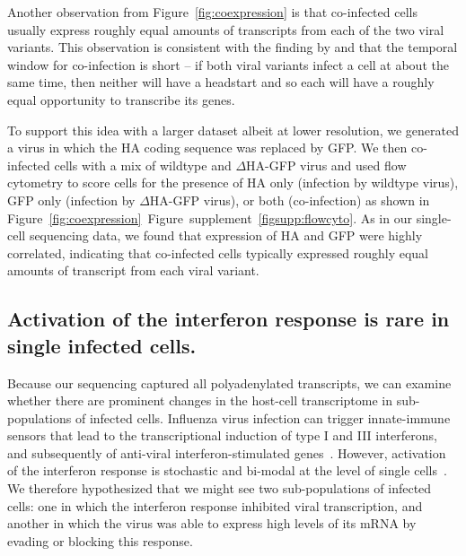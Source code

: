 \documentclass[9pt,lineno]{elife}
\begin{document}
Another observation from Figure~\ref{fig:coexpression} is that co-infected cells usually express roughly equal amounts of transcripts from each of the two viral variants.
This observation is consistent with the finding by \citet{Dou:2017cp} and \citet{Huang:2008gy} that the temporal window for co-infection is short -- if both viral variants infect a cell at about the same time, then neither will have a headstart and so each will have a roughly equal opportunity to transcribe its genes.

To support this idea with a larger dataset albeit at lower resolution, we generated a virus in which the HA coding sequence was replaced by GFP.
We then co-infected cells with a mix of wildtype and $\Delta$HA-GFP virus and used flow cytometry to score cells for the presence of HA only (infection by wildtype virus), GFP only (infection by $\Delta$HA-GFP virus), or both (co-infection) as shown in Figure~\ref{fig:coexpression}~Figure~supplement~\ref{figsupp:flowcyto}.
As in our single-cell sequencing data, we found that expression of HA and GFP were highly correlated, indicating that co-infected cells typically expressed roughly equal amounts of transcript from each viral variant.

\subsection{Activation of the interferon response is rare in single infected cells.}
Because our sequencing captured all polyadenylated transcripts, we can examine whether there are prominent changes in the host-cell transcriptome in sub-populations of infected cells.
Influenza virus infection can trigger innate-immune sensors that lead to the transcriptional induction of type I and III interferons, and subsequently of anti-viral interferon-stimulated genes~\citep{Killip:2015dw,Iwasaki:2014dw,crotta2013type}.
However, activation of the interferon response is stochastic and bi-modal at the level of single cells~\citep{Chen:2010cr,shalek2013single,shalek2014single,PerezCidoncha:2014jr,bhushal2017cell,hagai2017gene}.
We therefore hypothesized that we might see two sub-populations of infected cells: one in which the interferon response inhibited viral transcription, and another in which the virus was able to express high levels of its mRNA by evading or blocking this response.
\end{document}
